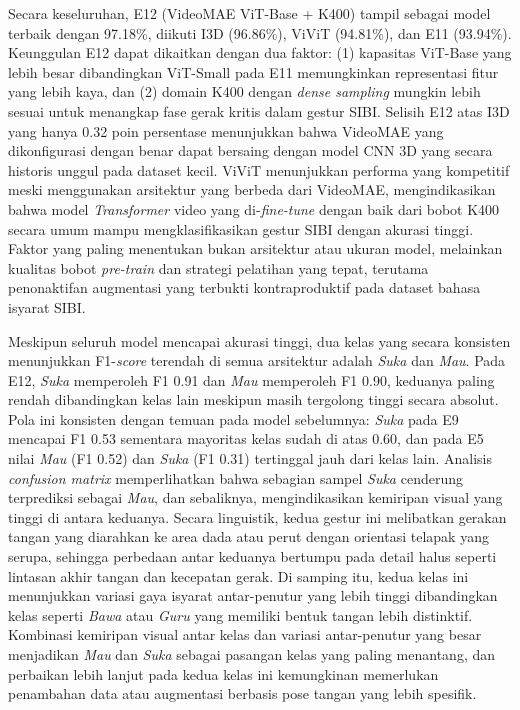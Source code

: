Secara keseluruhan, E12 (VideoMAE ViT-Base + K400) tampil sebagai model terbaik dengan 97.18\%, diikuti I3D (96.86\%), ViViT (94.81\%), dan E11 (93.94\%). Keunggulan E12 dapat dikaitkan dengan dua faktor: (1) kapasitas ViT-Base yang lebih besar dibandingkan ViT-Small pada E11 memungkinkan representasi fitur yang lebih kaya, dan (2) domain K400 dengan \textit{dense sampling} mungkin lebih sesuai untuk menangkap fase gerak kritis dalam gestur SIBI. Selisih E12 atas I3D yang hanya 0.32 poin persentase menunjukkan bahwa VideoMAE yang dikonfigurasi dengan benar dapat bersaing dengan model CNN 3D yang secara historis unggul pada dataset kecil. ViViT menunjukkan performa yang kompetitif meski menggunakan arsitektur yang berbeda dari VideoMAE, mengindikasikan bahwa model \textit{Transformer} video yang di-\textit{fine-tune} dengan baik dari bobot K400 secara umum mampu mengklasifikasikan gestur SIBI dengan akurasi tinggi. Faktor yang paling menentukan bukan arsitektur atau ukuran model, melainkan kualitas bobot \textit{pre-train} dan strategi pelatihan yang tepat, terutama penonaktifan augmentasi yang terbukti kontraproduktif pada dataset bahasa isyarat SIBI.\par

Meskipun seluruh model mencapai akurasi tinggi, dua kelas yang secara konsisten menunjukkan F1-\textit{score} terendah di semua arsitektur adalah \textit{Suka} dan \textit{Mau}. Pada E12, \textit{Suka} memperoleh F1 0.91 dan \textit{Mau} memperoleh F1 0.90, keduanya paling rendah dibandingkan kelas lain meskipun masih tergolong tinggi secara absolut. Pola ini konsisten dengan temuan pada model sebelumnya: \textit{Suka} pada E9 mencapai F1 0.53 sementara mayoritas kelas sudah di atas 0.60, dan pada E5 nilai \textit{Mau} (F1 0.52) dan \textit{Suka} (F1 0.31) tertinggal jauh dari kelas lain. Analisis \textit{confusion matrix} memperlihatkan bahwa sebagian sampel \textit{Suka} cenderung terprediksi sebagai \textit{Mau}, dan sebaliknya, mengindikasikan kemiripan visual yang tinggi di antara keduanya. Secara linguistik, kedua gestur ini melibatkan gerakan tangan yang diarahkan ke area dada atau perut dengan orientasi telapak yang serupa, sehingga perbedaan antar keduanya bertumpu pada detail halus seperti lintasan akhir tangan dan kecepatan gerak. Di samping itu, kedua kelas ini menunjukkan variasi gaya isyarat antar-penutur yang lebih tinggi dibandingkan kelas seperti \textit{Bawa} atau \textit{Guru} yang memiliki bentuk tangan lebih distinktif. Kombinasi kemiripan visual antar kelas dan variasi antar-penutur yang besar menjadikan \textit{Mau} dan \textit{Suka} sebagai pasangan kelas yang paling menantang, dan perbaikan lebih lanjut pada kedua kelas ini kemungkinan memerlukan penambahan data atau augmentasi berbasis pose tangan yang lebih spesifik.\par
\par



